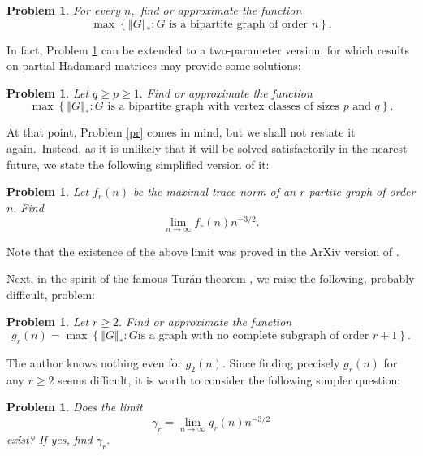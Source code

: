 \documentclass[12pt]{article}%
\newtheorem{problem}[theorem]{Problem}
\begin{document}
\begin{problem}
\label{prb2}For every $n,$ find or approximate the function
\[
\max\left\{  \left\Vert G\right\Vert _{\ast}:G\text{ is a bipartite graph of
order }n\right\}  .
\]

\end{problem}

In fact, Problem \ref{prb2} can be extended to a two-parameter version, for
which results on partial Hadamard matrices \cite{Lau00} may provide some solutions:

\begin{problem}
Let $q\geq p\geq1.$ Find or approximate the function
\[
\max\left\{  \left\Vert G\right\Vert _{\ast}:G\text{ is a bipartite graph with
vertex classes of sizes }p\text{ and }q\right\}  .
\]

\end{problem}

At that point, Problem \ref{pr} comes in mind, but we shall not restate it
again.\ Instead, as it is unlikely that it will be solved satisfactorily in
the nearest future, we state the following simplified version of it:

\begin{problem}
Let $f_{r}\left(  n\right)  $ be the maximal trace norm of an $r$-partite
graph of order $n.$ Find%
\[
\lim_{n\rightarrow\infty}f_{r}\left(  n\right)  n^{-3/2}.
\]

\end{problem}

Note that the existence of the above limit was proved in the ArXiv version of
\cite{Nik15a}.\medskip

Next, in the spirit of the famous Tur\'{a}n theorem \cite{Tur41}, we raise the
following, probably difficult, problem:

\begin{problem}
Let $r\geq2.$ Find or approximate the function
\[
g_{r}\left(  n\right)  =\max\left\{  \left\Vert G\right\Vert _{\ast}:G\text{
is a graph with no complete subgraph of order }r+1\right\}  .
\]

\end{problem}

The author knows nothing even for $g_{2}\left(  n\right)  $. Since finding
precisely $g_{r}\left(  n\right)  $ for any $r\geq2$ seems difficult, it is
worth to consider the following simpler question:

\begin{problem}
Does the limit
\[
\gamma_{r}=\lim_{n\rightarrow\infty}g_{r}\left(  n\right)  n^{-3/2}%
\]
exist? If yes, find $\gamma_{r}.$
\end{problem}
\end{document}
